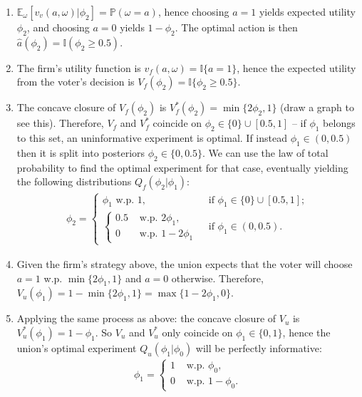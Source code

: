 \documentclass[a4paper]{article}
\begin{document}
	\begin{enumerate}
		\item $\mathbb{E}_\omega[v_v(a,\omega)|\phi_2] = \mathbb{P}( \omega = a )$, hence choosing $a=1$ yields expected utility $\phi_2$, and choosing $a=0$ yields $1-\phi_2$. The optimal action is then $\hat{a}(\phi_2) = \mathbb{I}(\phi_2 \geq 0.5)$.
		
		\item The firm's utility function is $v_f(a,\omega) = \mathbb{I}\{a=1\}$, hence the expected utility from the voter's decision is $V_f(\phi_2) = \mathbb{I}\{\phi_2 \geq 0.5\}$.
		
		\item The concave closure of $V_f(\phi_2)$ is $V^*_f(\phi_2) = \min \{2\phi_2, 1 \}$ (draw a graph to see this). Therefore, $V_f$ and $V^*_f$ coincide on $\phi_2 \in \{0\} \cup [0.5,1]$ -- if $\phi_1$ belongs to this set, an uninformative experiment is optimal. If instead $\phi_1 \in (0,0.5)$ then it is split into posteriors $\phi_2 \in \{0,0.5\}$. We can use the law of total probability to find the optimal experiment for that case, eventually yielding the following distributions $Q_f(\phi_2|\phi_1)$:
		\begin{align*}
			\phi_2 = 
			\begin{cases}
				\phi_1 \text{ w.p. } 1, & \text{ if } \phi_1 \in \{0\} \cup [0.5,1];
				\\
				\begin{cases}
					0.5 & \text{ w.p. } 2 \phi_1,
					\\
					0 & \text{ w.p. } 1-2 \phi_1
				\end{cases}
				& \text{ if } \phi_1 \in (0, 0.5).
			\end{cases}
		\end{align*}
	
		\item Given the firm's strategy above, the union expects that the voter will choose $a=1$ w.p. $\min\{2\phi_1, 1\}$ and $a=0$ otherwise. Therefore, $V_u(\phi_1) = 1 - \min\{2\phi_1, 1\} = \max \{ 1-2\phi_1, 0 \}$.
		
		\item Applying the same process as above: the concave closure of $V_u$ is $V^*_u(\phi_1) = 1-\phi_1$. So $V_u$ and $V^*_u$ only coincide on $\phi_1 \in \{0,1\}$, hence the union's optimal experiment $Q_u(\phi_1|\phi_0)$ will be perfectly informative:
		\begin{align*}
			\phi_1 = 
			\begin{cases}
				1 & \text{ w.p. } \phi_0,
				\\
				0 & \text{ w.p. } 1-\phi_0.
			\end{cases}
		\end{align*}
		

\end{enumerate}
\end{document}
